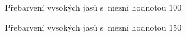 \documentclass[12pt, a4paper]{report}
\begin{document}
	\begin{figure}[!htb]
	\centering
	\label{fig:jas_0_100}
	\caption{Přebarvení vysokých jasů s~mezní hodnotou 100}
	\end{figure}	
	
	\begin{figure}[!htb]
	\centering
	\label{fig:jas_0_150}
	\caption{Přebarvení vysokých jasů s~mezní hodnotou 150}
	\end{figure}
	
\end{document}
